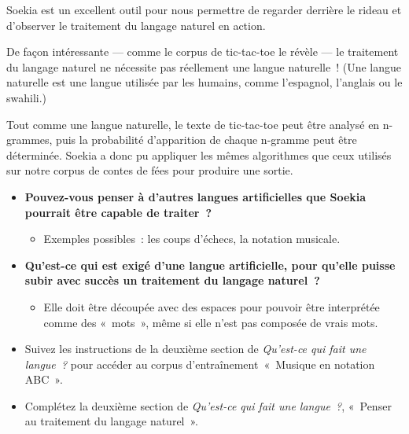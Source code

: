 \documentclass[12pt,a4paper]{article}
\begin{document}
\begin{keypointbox}
  Soekia est un excellent outil pour nous permettre de regarder derrière le rideau et d'observer le traitement du langage naturel en action.

  De façon intéressante — comme le corpus de tic-tac-toe le révèle — le traitement du langage naturel ne nécessite pas réellement une langue naturelle~! (Une langue naturelle est une langue utilisée par les humains, comme l'espagnol, l'anglais ou le swahili.)

  Tout comme une langue naturelle, le texte de tic-tac-toe peut être analysé en n-grammes, puis la probabilité d'apparition de chaque n-gramme peut être déterminée. Soekia a donc pu appliquer les mêmes algorithmes que ceux utilisés sur notre corpus de contes de fées pour produire une sortie.
\end{keypointbox}

\begin{thinkbox}
  \begin{itemize}
    \item \textbf{Pouvez-vous penser à d'autres langues artificielles que Soekia pourrait être capable de traiter~?}
    \begin{itemize}
      \item Exemples possibles~: les coups d'échecs, la notation musicale.
    \end{itemize}
    \item \textbf{Qu'est-ce qui est exigé d'une langue artificielle, pour qu'elle puisse subir avec succès un traitement du langage naturel~?}
    \begin{itemize}
      \item Elle doit être découpée avec des espaces pour pouvoir être interprétée comme des «~mots~», même si elle n'est pas composée de vrais mots.
    \end{itemize}
  \end{itemize}
\end{thinkbox}

\begin{activitybox}
  \begin{itemize}
    \item Suivez les instructions de la deuxième section de \emph{Qu'est-ce qui fait une langue~?} pour accéder au corpus d'entraînement~«~Musique en notation ABC~».
    \item Complétez la deuxième section de \emph{Qu'est-ce qui fait une langue~?}, «~Penser au traitement du langage naturel~».
  \end{itemize}
\end{activitybox}
\end{document}
